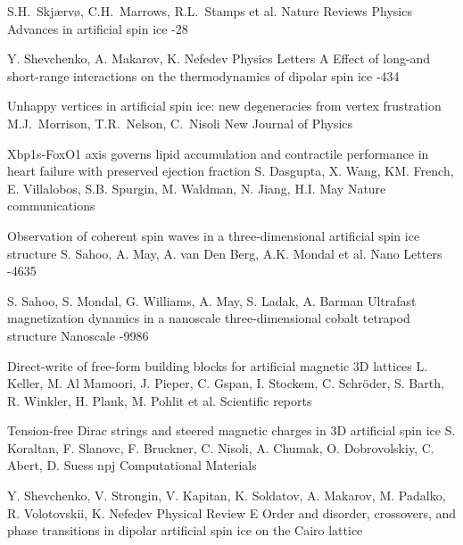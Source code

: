 \documentclass[10pt]{article}
\begin{document}

\begin{thebibliography}{20}
\setlength{\parsep}{0pt}\setlength{\itemsep}{3pt}

\by S.H.~Skjærvø, C.H.~Marrows, R.L.~Stamps et al.
\jour Nature Reviews Physics
\paper Advances in artificial spin ice
-28

\by Y. Shevchenko, A. Makarov, K. Nefedev
\jour Physics Letters A
\paper Effect of long-and short-range interactions on the thermodynamics of dipolar spin ice
-434

\paper Unhappy vertices in artificial spin ice: new degeneracies from vertex frustration
\by M.J.~Morrison, T.R.~Nelson, C.~Nisoli
\jour New Journal of Physics

\paper Xbp1s-FoxO1 axis governs lipid accumulation and contractile performance in heart failure with preserved ejection fraction
\by S. Dasgupta, X. Wang, KM. French, E. Villalobos, S.B. Spurgin, M. Waldman, N. Jiang, H.I. May
\jour Nature communications

\paper Observation of coherent spin waves in a three-dimensional artificial spin ice structure
\by S. Sahoo, A. May, A. van Den Berg, A.K. Mondal et al.
\jour Nano Letters
-4635

\by S. Sahoo, S. Mondal, G. Williams, A. May, S. Ladak, A. Barman
\paper  Ultrafast magnetization dynamics in a nanoscale three-dimensional cobalt tetrapod structure
\jour Nanoscale
-9986

\paper Direct-write of free-form building blocks for artificial magnetic 3D lattices
\by L. Keller, M. Al Mamoori, J. Pieper, C. Gspan, I. Stockem, C. Schr{\"o}der, S. Barth, R. Winkler, H. Plank, M. Pohlit et al.
\jour Scientific reports

\paper Tension-free Dirac strings and steered magnetic charges in 3D artificial spin ice
\by S. Koraltan, F. Slanovc, F. Bruckner, C. Nisoli, A. Chumak, O. Dobrovolskiy, C. Abert, D. Suess
\jour npj Computational Materials

\by Y. Shevchenko, V. Strongin, V. Kapitan, K. Soldatov, A. Makarov, M. Padalko, R. Volotovskii, K. Nefedev
\jour Physical Review E
\paper Order and disorder, crossovers, and phase transitions in dipolar artificial spin ice on the Cairo lattice


\end{thebibliography}
\end{document}
